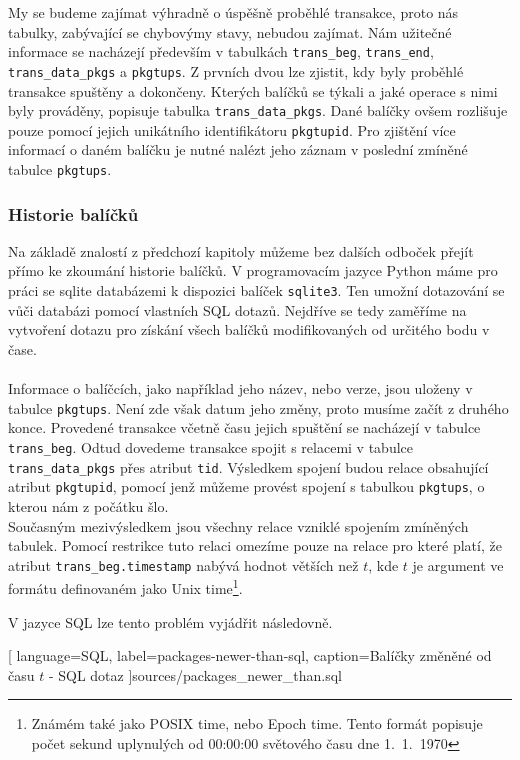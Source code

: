 \documentclass[10pt,a4paper]{article}
\begin{document}
			My se budeme zajímat výhradně o úspěšně proběhlé transakce, proto nás tabulky, zabývající se chybovýmy stavy, nebudou zajímat. Nám užitečné informace se nacházejí především v tabulkách \texttt{trans\_beg}, \texttt{trans\_end}, \texttt{trans\_data\_pkgs} a \texttt{pkgtups}. Z prvních dvou lze zjistit, kdy byly proběhlé transakce spuštěny a dokončeny. Kterých balíčků se týkali a jaké operace s nimi byly prováděny, popisuje tabulka \texttt{trans\_data\_pkgs}. Dané balíčky ovšem rozlišuje pouze pomocí jejich unikátního identifikátoru \texttt{pkgtupid}. Pro zjištění více informací o daném balíčku je nutné nalézt jeho záznam v poslední zmíněné tabulce \texttt{pkgtups}.

			\subsubsection{Historie balíčků}
			Na základě znalostí z předchozí kapitoly můžeme bez dalších odboček přejít přímo ke zkoumání historie balíčků. V programovacím jazyce Python máme pro práci se sqlite databázemi k dispozici balíček \texttt{sqlite3}. Ten umožní dotazování se vůči databázi pomocí vlastních SQL dotazů. Nejdříve se tedy zaměříme na vytvoření dotazu pro získání všech balíčků modifikovaných od určitého bodu v čase.
			\\
			\\
			Informace o balíčcích, jako například jeho název, nebo verze, jsou uloženy v tabulce \texttt{pkgtups}. Není zde však datum jeho změny, proto musíme začít z druhého konce. Provedené transakce včetně času jejich spuštění se nacházejí v tabulce \texttt{trans\_beg}. Odtud dovedeme transakce spojit s relacemi v tabulce \texttt{trans\_data\_pkgs} přes atribut \texttt{tid}. Výsledkem spojení budou relace obsahující atribut \texttt{pkgtupid}, pomocí jenž můžeme provést spojení s tabulkou \texttt{pkgtups}, o kterou nám z počátku šlo.
			\\
			Současným mezivýsledkem jsou všechny relace vzniklé spojením zmíněných tabulek. Pomocí restrikce tuto relaci omezíme pouze na relace pro které platí, že atribut \texttt{trans\_beg.timestamp} nabývá hodnot větších než $t$, kde $t$ je argument ve formátu definovaném jako Unix time\footnote{Známém také jako POSIX time, nebo Epoch time. Tento formát popisuje počet sekund uplynulých od 00:00:00 světového času dne 1.~1.~1970}.

			V jazyce SQL lze tento problém vyjádřit následovně.

			
			[
				language=SQL,
				label=packages-newer-than-sql,
				caption={Balíčky změněné od času $t$ - SQL dotaz}
			]{sources/packages_newer_than.sql}
\end{document}
